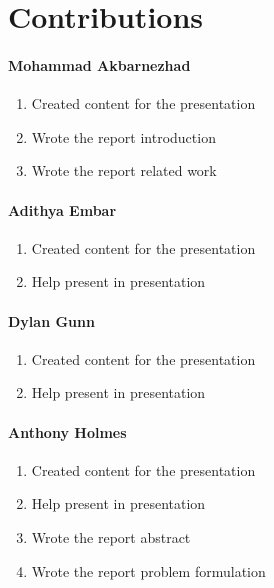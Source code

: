 \section{Contributions}

\paragraph{Mohammad Akbarnezhad}
\begin{enumerate}
    \item Created content for the presentation
    \item Wrote the report introduction
    \item Wrote the report related work
\end{enumerate}

\paragraph{Adithya Embar}
\begin{enumerate}
    \item Created content for the presentation
    \item Help present in presentation
\end{enumerate}

\paragraph{Dylan Gunn}
\begin{enumerate}
    \item Created content for the presentation
    \item Help present in presentation

\end{enumerate}

\paragraph{Anthony Holmes}
\begin{enumerate}
    \item Created content for the presentation
    \item Help present in presentation
    \item Wrote the report abstract
    \item Wrote the report problem formulation
    
\end{enumerate}
